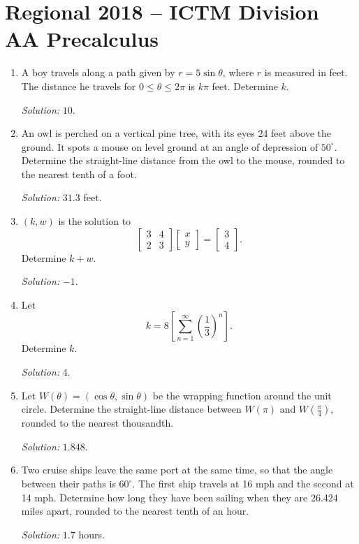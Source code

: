 \documentclass[11pt]{article}
\begin{document}
\section*{Regional 2018 -- ICTM Division AA Precalculus}
\begin{enumerate}[label=\textbf{\arabic*.}]
\item A boy travels along a path given by $r=5\sin\theta$, where $r$ is measured in feet. The distance he travels for $0\leq\theta\leq2\pi$ is $k\pi$ feet. Determine $k$.\par\textit{Solution: }$10$.

\item An owl is perched on a vertical pine tree, with its eyes 24 feet above the ground. It spots a mouse on level ground at an angle of depression of $50^\circ$. Determine the straight-line distance from the owl to the mouse, rounded to the nearest tenth of a foot.\par\textit{Solution: }$31.3$ feet.

\item $(k,w)$ is the solution to
\[
\begin{bmatrix}3&4\\2&3\end{bmatrix}
\begin{bmatrix}x\\y\end{bmatrix}
=\begin{bmatrix}3\\4\end{bmatrix}.
\]
Determine $k+w$.\par\textit{Solution: }$-1$.

\item Let
\[
k=8\left[\sum_{n=1}^{\infty}\left(\frac13\right)^n\right].
\]
Determine $k$.\par\textit{Solution: }$4$.

\item Let $W(\theta)=(\cos\theta,\sin\theta)$ be the wrapping function around the unit circle. Determine the straight-line distance between $W(\pi)$ and $W\left(\frac{\pi}{4}\right)$, rounded to the nearest thousandth.\par\textit{Solution: }$1.848$.

\item Two cruise ships leave the same port at the same time, so that the angle between their paths is $60^\circ$. The first ship travels at 16 mph and the second at 14 mph. Determine how long they have been sailing when they are 26.424 miles apart, rounded to the nearest tenth of an hour.\par\textit{Solution: }$1.7$ hours.


\end{enumerate}
\end{document}
